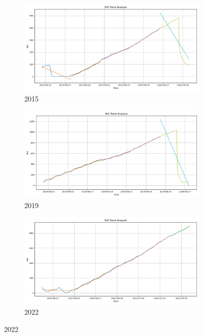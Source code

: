 \begin{figure}[h]
	\centering
	\caption{15-days BUI polyfit trend}
	\begin{subfigure}{0.3\textwidth}
		\centering
		\includegraphics[width=\textwidth]{graphs/polyfit_trend_analysis/2015_15days_BLOCK3days_bui_trend_analysis.png}
		\caption{2015}
		\label{fig:2015_polyfit_bui}
	\end{subfigure}
	\hfill
	\begin{subfigure}{0.3\textwidth}
		\centering
		\includegraphics[width=\textwidth]{graphs/polyfit_trend_analysis/2019_15days_BLOCK3days_bui_trend_analysis.png}
		\caption{2019}
		\label{fig:2019_polyfit_bui}
	\end{subfigure}
	\hfill
	\begin{subfigure}{0.3\textwidth}
		\centering
		\includegraphics[width=\textwidth]{graphs/polyfit_trend_analysis/2022_15days_BLOCK3days_bui_trend_analysis.png}
		\caption{2022}
		\label{fig:2022_polyfit_bui}
	\end{subfigure}
	
	\label{fig:bui_polyfit_15}
\end{figure}

